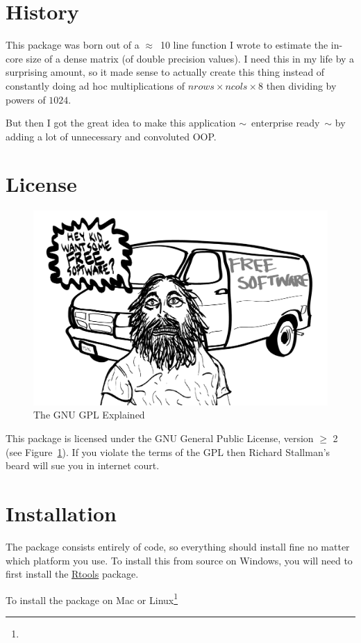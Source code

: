 \section{History}

This package was born out of a $\approx$~10 line function I wrote to estimate the in-core size of a dense matrix (of double precision values).  I need this in my life by a surprising amount, so it made sense to actually create this thing instead of constantly doing ad hoc multiplications of $nrows\times ncols \times 8$ then dividing by powers of $1024$.

But then I got the great idea to make this application $\sim$~enterprise ready~$\sim$ by adding a lot of unnecessary and convoluted OOP.



\section{License}

\begin{figure}[th]
  \centering
  \includegraphics[scale=.35]{./include/gpl.png}
  \caption{The GNU GPL Explained}
  \label{fig:gnu}
\end{figure}
This package is licensed under the GNU General Public License, version $\geq$ 2 (see Figure~\ref{fig:gnu}).
If you violate the terms of the GPL then Richard Stallman's beard will sue you in internet court.



\section{Installation}

The package consists entirely of  code, so everything should install fine no matter which platform you use.  To install this from source on Windows, you will need to first install the \href{http://cran.r-project.org/bin/windows/Rtools/Rtools216.exe}{Rtools} package.

To install the package on Mac or Linux\footnote{\interject}
